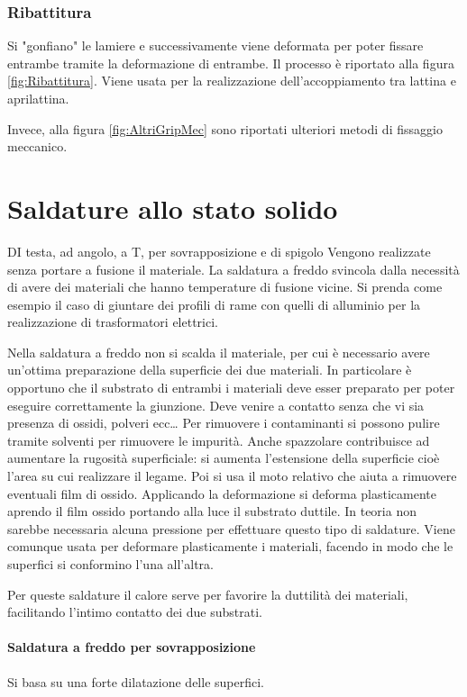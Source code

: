 \subsubsection{Ribattitura}
Si "gonfiano" le lamiere e successivamente viene deformata per poter fissare entrambe tramite la deformazione di entrambe. 
Il processo è riportato alla figura \ref{fig:Ribattitura}.
Viene usata per la realizzazione dell'accoppiamento tra lattina e aprilattina.

Invece, alla figura \ref{fig:AltriGripMec} sono riportati ulteriori metodi di fissaggio meccanico.

\pagebreak


\section{Saldature allo stato solido}
DI testa, ad angolo, a T, per sovrapposizione e di spigolo
\todo{\\Elenco}
Vengono realizzate senza portare a fusione il materiale.
La saldatura a freddo svincola dalla necessità di avere dei materiali che hanno temperature di fusione vicine.
Si prenda come esempio il caso di giuntare dei profili di rame con quelli di alluminio per la realizzazione di trasformatori elettrici.

Nella saldatura a freddo non si scalda il materiale, per cui è necessario avere un'ottima preparazione della superficie dei due materiali.
In particolare è opportuno che il substrato di entrambi i materiali deve esser preparato per poter eseguire correttamente la giunzione.
Deve venire a contatto senza che vi sia presenza di ossidi, polveri ecc\dots
Per rimuovere i contaminanti si possono pulire tramite solventi per rimuovere le impurità. Anche spazzolare contribuisce ad aumentare la rugosità superficiale: si aumenta l'estensione della superficie cioè l'area su cui realizzare il legame.
Poi si usa il moto relativo che aiuta a rimuovere eventuali film di ossido.
Applicando la deformazione si deforma plasticamente aprendo il film ossido portando alla luce il substrato duttile.
In teoria non sarebbe necessaria alcuna pressione per effettuare questo tipo di saldature. Viene comunque usata per deformare plasticamente i materiali, facendo in modo che le superfici si conformino l'una all'altra.

Per queste saldature il calore serve per favorire la duttilità dei materiali, facilitando l'intimo contatto dei due substrati.

\paragraph{Saldatura a freddo per sovrapposizione}
Si basa su una forte dilatazione delle superfici.

